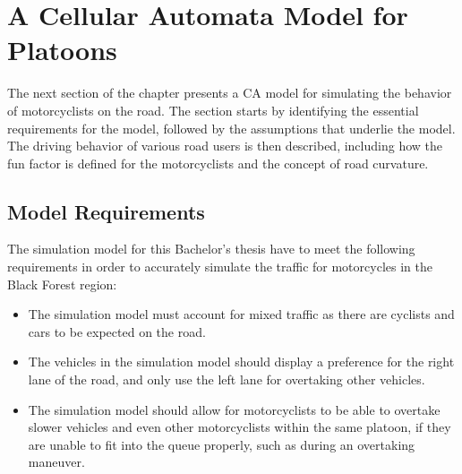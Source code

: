\chapter{A Cellular Automata Model for Platoons}
\label{chapter:A Cellular Automata Model for Platoons}
The next section of the chapter presents a CA model for simulating the behavior of motorcyclists on the road. The section starts by identifying the essential requirements for the model, followed by the assumptions that underlie the model. The driving behavior of various road users is then described, including how the fun factor is defined for the motorcyclists and the concept of road curvature.

\section{Model Requirements}
\label{sec:Model Requirements}
The simulation model for this Bachelor's thesis have to meet the following requirements in order to accurately simulate the traffic for motorcycles in the Black Forest region:
\begin{itemize}
    \item The simulation model must account for mixed traffic as there are cyclists and cars to be expected on the road. 
    
    \item The vehicles in the simulation model should display a preference for the right lane of the road, and only use the left lane for overtaking other vehicles.
    \item The simulation model should allow for motorcyclists to be able to overtake slower vehicles and even other motorcyclists within the same platoon, if they are unable to fit into the queue properly, such as during an overtaking maneuver.
\end{itemize}

